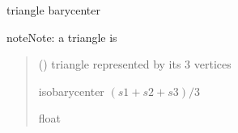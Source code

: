 \documentclass[letterpaper,10pt,english]{sphinxmanual}
\begin{document}
\begin{fulllineitems}
\label{\detokenize{reference:basicgeometry.triangle_barycenter}}
\pysigstartsignatures
{}
\pysigstopsignatures
\sphinxAtStartPar
triangle barycenter

\begin{sphinxadmonition}{note}{Note:}
\sphinxAtStartPar
a triangle is \sphinxcode{\sphinxupquote{{[}(x1,y1,z1),(x2,y2,z2),(x3,y3,z3){]}}}
\end{sphinxadmonition}
\begin{quote}\begin{description}
\sphinxAtStartPar
{} () \textendash{} triangle represented by its 3 vertices

\sphinxAtStartPar
isobarycenter \((s1 + s2 + s3)/3\)

\sphinxAtStartPar
float

\end{description}\end{quote}

\end{fulllineitems}

\end{document}
